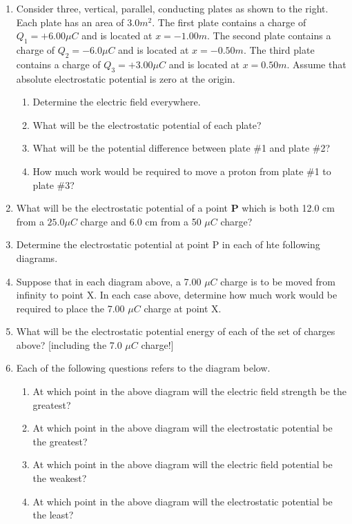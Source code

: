 \documentclass[12pt]{article}
\begin{document}
\begin{enumerate}
\item Consider three, vertical, parallel, conducting plates as shown to the right. Each plate has an area of $3.0 m^{2}$. The first plate contains a charge of $Q_{1} = +6.00\mu C$ and is located at $x = -1.00 m$. The second plate contains a charge of $Q_{2} = -6.0\mu C$ and is located at $x = -0.50m$. The third plate contains a charge of $Q_{3} = +3.00\mu C$ and is located at $x = 0.50 m$. Assume that absolute electrostatic potential is zero at the origin.
\begin{enumerate}
  \item Determine the electric field everywhere.
  \item What will be the electrostatic potential of each plate?
  \item What will be the potential difference between plate \#1 and plate \#2?
  \item How much work would be required to move a proton from plate \#1 to plate \#3?
\end{enumerate}

\item What will be the electrostatic potential of a point \textbf{P} which is both 12.0 cm from a $25.0 \mu C$ charge and 6.0 cm from a 50 $\mu C$ charge?

\item Determine the electrostatic potential at point P in each of hte following diagrams.

\item Suppose that in each diagram above, a 7.00 $\mu C$ charge is to be moved from infinity to point X. In each case above, determine how much work would be required to place the 7.00 $\mu C$ charge at point X.

\item What will be the electrostatic potential energy of each of the set of charges above? [including the 7.0 $\mu C$ charge!]

\item Each of the following questions refers to the diagram below.

\begin{enumerate}
  \item At which point in the above diagram will the electric field strength be the greatest?
  \item At which point in the above diagram will the electrostatic potential be the greatest?
  \item At which point in the above diagram will the electric field potential be the weakest?
  \item At which point in the above diagram will the electrostatic potential be the least?
\end{enumerate}

\end{enumerate}
\end{document}
